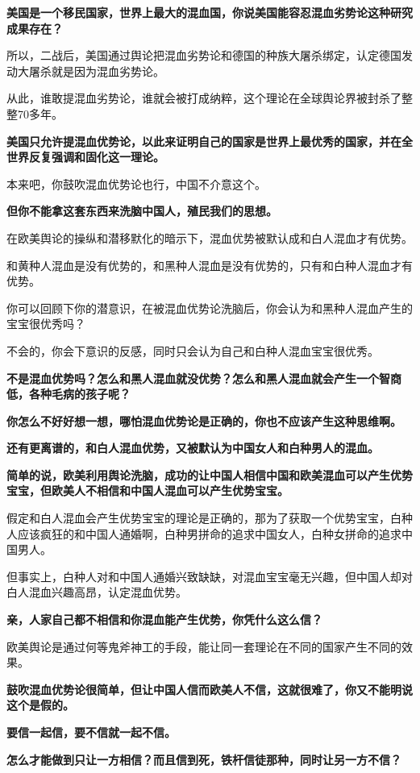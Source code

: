 \documentclass[UTF8, 11pt, oneside]{ctexart}
\newcommand{\zd}[1]{\textbf{\textcolor[RGB]{123,12,0}{#1}}} %
\begin{document}
\zd{美国是一个移民国家，世界上最大的混血国，你说美国能容忍混血劣势论这种研究成果存在？}

所以，二战后，美国通过舆论把混血劣势论和德国的种族大屠杀绑定，认定德国发动大屠杀就是因为混血劣势论。

从此，谁敢提混血劣势论，谁就会被打成纳粹，这个理论在全球舆论界被封杀了整整70多年。

\zd{美国只允许提混血优势论，以此来证明自己的国家是世界上最优秀的国家，并在全世界反复强调和固化这一理论。}

本来吧，你鼓吹混血优势论也行，中国不介意这个。

\zd{但你不能拿这套东西来洗脑中国人，殖民我们的思想。}

在欧美舆论的操纵和潜移默化的暗示下，混血优势被默认成和白人混血才有优势。

和黄种人混血是没有优势的，和黑种人混血是没有优势的，只有和白种人混血才有优势。

你可以回顾下你的潜意识，在被混血优势论洗脑后，你会认为和黑种人混血产生的宝宝很优秀吗？

不会的，你会下意识的反感，同时只会认为自己和白种人混血宝宝很优秀。

\zd{不是混血优势吗？怎么和黑人混血就没优势？怎么和黑人混血就会产生一个智商低，各种毛病的孩子呢？}

\zd{你怎么不好好想一想，哪怕混血优势论是正确的，你也不应该产生这种思维啊。}

\zd{还有更离谱的，和白人混血优势，又被默认为中国女人和白种男人的混血。}

\zd{简单的说，欧美利用舆论洗脑，成功的让中国人相信中国和欧美混血可以产生优势宝宝，但欧美人不相信和中国人混血可以产生优势宝宝。}

假定和白人混血会产生优势宝宝的理论是正确的，那为了获取一个优势宝宝，白种人应该疯狂的和中国人通婚啊，白种男拼命的追求中国女人，白种女拼命的追求中国男人。

但事实上，白种人对和中国人通婚兴致缺缺，对混血宝宝毫无兴趣，但中国人却对白人混血兴趣高昂，认定混血优势。

\zd{亲，人家自己都不相信和你混血能产生优势，你凭什么这么信？}

欧美舆论是通过何等鬼斧神工的手段，能让同一套理论在不同的国家产生不同的效果。

\zd{鼓吹混血优势论很简单，但让中国人信而欧美人不信，这就很难了，你又不能明说这个是假的。}

\zd{要信一起信，要不信就一起不信。}

\zd{怎么才能做到只让一方相信？而且信到死，铁杆信徒那种，同时让另一方不信？}
\end{document}
